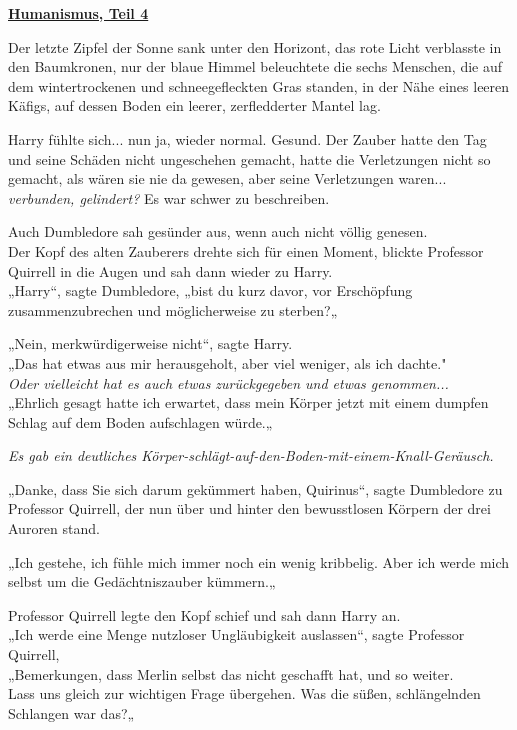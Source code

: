 

\hypertarget{humanismus-teil-4}{%

\textbf{\uline{Humanismus, Teil 4}}

\hfill\break Der letzte Zipfel der Sonne sank unter den Horizont, das rote Licht verblasste in den Baumkronen, nur der blaue Himmel beleuchtete die sechs Menschen, die auf dem wintertrockenen und schneegefleckten Gras standen, in der Nähe eines leeren Käfigs, auf dessen Boden ein leerer, zerfledderter Mantel lag.

Harry fühlte sich... nun ja, wieder normal. Gesund. Der Zauber hatte den Tag und seine Schäden nicht ungeschehen gemacht, hatte die Verletzungen nicht so gemacht, als wären sie nie da gewesen, aber seine Verletzungen waren... \emph{verbunden, gelindert?} Es war schwer zu beschreiben.

Auch Dumbledore sah gesünder aus, wenn auch nicht völlig genesen.\\ Der Kopf des alten Zauberers drehte sich für einen Moment, blickte Professor Quirrell in die Augen und sah dann wieder zu Harry.\\ „Harry“, sagte Dumbledore, „bist du kurz davor, vor Erschöpfung zusammenzubrechen und möglicherweise zu sterben?„

„Nein, merkwürdigerweise nicht“, sagte Harry.\\ „Das hat etwas aus mir herausgeholt, aber viel weniger, als ich dachte."\\ \emph{Oder vielleicht hat es auch etwas zurückgegeben und etwas genommen...}\\ „Ehrlich gesagt hatte ich erwartet, dass mein Körper jetzt mit einem dumpfen Schlag auf dem Boden aufschlagen würde.„

\emph{Es gab ein deutliches Körper-schlägt-auf-den-Boden-mit-einem-Knall-Geräusch.}

„Danke, dass Sie sich darum gekümmert haben, Quirinus“, sagte Dumbledore zu Professor Quirrell, der nun über und hinter den bewusstlosen Körpern der drei Auroren stand.

„Ich gestehe, ich fühle mich immer noch ein wenig kribbelig. Aber ich werde mich selbst um die Gedächtniszauber kümmern.„

Professor Quirrell legte den Kopf schief und sah dann Harry an.\\ „Ich werde eine Menge nutzloser Ungläubigkeit auslassen“, sagte Professor Quirrell,\\ „Bemerkungen, dass Merlin selbst das nicht geschafft hat, und so weiter.\\ Lass uns gleich zur wichtigen Frage übergehen. Was die süßen, schlängelnden Schlangen war das?„

}
